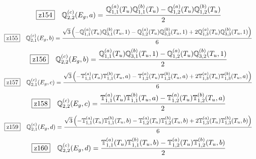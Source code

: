 \documentclass[fleqn,10pt,landscape]{jsarticle}
\begin{document}
\begin{dmath*}
\hspace*{3mm}\fbox{z154}\quad \mathbb{Q}_{2,2}^{(c)}(E_{g},a)=\frac{\mathbb{Q}_{1,1}^{(a)}(T_{u}) \mathbb{Q}_{1,1}^{(b)}(T_{u}) - \mathbb{Q}_{1,2}^{(a)}(T_{u}) \mathbb{Q}_{1,2}^{(b)}(T_{u})}{2}
\end{dmath*}
\begin{dmath*}
\hspace*{3mm}\fbox{z155}\quad \mathbb{Q}_{2,1}^{(c)}(E_{g},b)=\frac{\sqrt{3} \left(- \mathbb{Q}_{1,1}^{(a)}(T_{u}) \mathbb{Q}_{3,1}^{(b)}(T_{u},1) - \mathbb{Q}_{1,2}^{(a)}(T_{u}) \mathbb{Q}_{3,2}^{(b)}(T_{u},1) + 2 \mathbb{Q}_{1,3}^{(a)}(T_{u}) \mathbb{Q}_{3,3}^{(b)}(T_{u},1)\right)}{6}
\end{dmath*}
\begin{dmath*}
\hspace*{3mm}\fbox{z156}\quad \mathbb{Q}_{2,2}^{(c)}(E_{g},b)=\frac{\mathbb{Q}_{1,1}^{(a)}(T_{u}) \mathbb{Q}_{3,1}^{(b)}(T_{u},1) - \mathbb{Q}_{1,2}^{(a)}(T_{u}) \mathbb{Q}_{3,2}^{(b)}(T_{u},1)}{2}
\end{dmath*}
\begin{dmath*}
\hspace*{3mm}\fbox{z157}\quad \mathbb{Q}_{2,1}^{(c)}(E_{g},c)=\frac{\sqrt{3} \left(- \mathbb{T}_{1,1}^{(a)}(T_{u}) \mathbb{T}_{1,1}^{(b)}(T_{u},a) - \mathbb{T}_{1,2}^{(a)}(T_{u}) \mathbb{T}_{1,2}^{(b)}(T_{u},a) + 2 \mathbb{T}_{1,3}^{(a)}(T_{u}) \mathbb{T}_{1,3}^{(b)}(T_{u},a)\right)}{6}
\end{dmath*}
\begin{dmath*}
\hspace*{3mm}\fbox{z158}\quad \mathbb{Q}_{2,2}^{(c)}(E_{g},c)=\frac{\mathbb{T}_{1,1}^{(a)}(T_{u}) \mathbb{T}_{1,1}^{(b)}(T_{u},a) - \mathbb{T}_{1,2}^{(a)}(T_{u}) \mathbb{T}_{1,2}^{(b)}(T_{u},a)}{2}
\end{dmath*}
\begin{dmath*}
\hspace*{3mm}\fbox{z159}\quad \mathbb{Q}_{2,1}^{(c)}(E_{g},d)=\frac{\sqrt{3} \left(- \mathbb{T}_{1,1}^{(a)}(T_{u}) \mathbb{T}_{1,1}^{(b)}(T_{u},b) - \mathbb{T}_{1,2}^{(a)}(T_{u}) \mathbb{T}_{1,2}^{(b)}(T_{u},b) + 2 \mathbb{T}_{1,3}^{(a)}(T_{u}) \mathbb{T}_{1,3}^{(b)}(T_{u},b)\right)}{6}
\end{dmath*}
\begin{dmath*}
\hspace*{3mm}\fbox{z160}\quad \mathbb{Q}_{2,2}^{(c)}(E_{g},d)=\frac{\mathbb{T}_{1,1}^{(a)}(T_{u}) \mathbb{T}_{1,1}^{(b)}(T_{u},b) - \mathbb{T}_{1,2}^{(a)}(T_{u}) \mathbb{T}_{1,2}^{(b)}(T_{u},b)}{2}
\end{dmath*}
\end{document}
